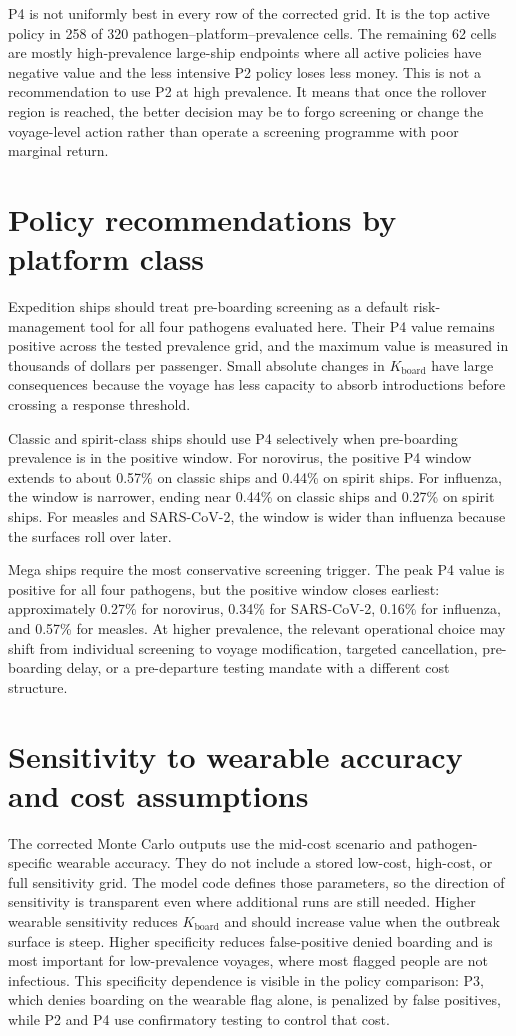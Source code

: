 P4 is not uniformly best in every row of the corrected grid.
It is the top active policy in 258 of 320 pathogen--platform--prevalence cells.
The remaining 62 cells are mostly high-prevalence large-ship endpoints where all active policies have
negative value and the less intensive P2 policy loses less money.
This is not a recommendation to use P2 at high prevalence.
It means that once the rollover region is reached, the better decision may be to forgo screening or
change the voyage-level action rather than operate a screening programme with poor marginal return.

\section{Policy recommendations by platform class}
Expedition ships should treat pre-boarding screening as a default risk-management tool for all four
pathogens evaluated here.
Their P4 value remains positive across the tested prevalence grid, and the maximum value is measured
in thousands of dollars per passenger.
Small absolute changes in $K_{\mathrm{board}}$ have large consequences because the voyage has less
capacity to absorb introductions before crossing a response threshold.

Classic and spirit-class ships should use P4 selectively when pre-boarding prevalence is in the
positive window.
For norovirus, the positive P4 window extends to about 0.57\% on classic ships and 0.44\% on spirit
ships.
For influenza, the window is narrower, ending near 0.44\% on classic ships and 0.27\% on spirit
ships.
For measles and SARS-CoV-2, the window is wider than influenza because the surfaces roll over later.

Mega ships require the most conservative screening trigger.
The peak P4 value is positive for all four pathogens, but the positive window closes earliest:
approximately 0.27\% for norovirus, 0.34\% for SARS-CoV-2, 0.16\% for influenza, and 0.57\% for
measles.
At higher prevalence, the relevant operational choice may shift from individual screening to voyage
modification, targeted cancellation, pre-boarding delay, or a pre-departure testing mandate with a
different cost structure.

\section{Sensitivity to wearable accuracy and cost assumptions}
The corrected Monte Carlo outputs use the mid-cost scenario and pathogen-specific wearable accuracy.
They do not include a stored low-cost, high-cost, or full sensitivity grid.
The model code defines those parameters, so the direction of sensitivity is transparent even where
additional runs are still needed.
Higher wearable sensitivity reduces $K_{\mathrm{board}}$ and should increase value when the outbreak
surface is steep.
Higher specificity reduces false-positive denied boarding and is most important for low-prevalence
voyages, where most flagged people are not infectious.
This specificity dependence is visible in the policy comparison: P3, which denies boarding on the
wearable flag alone, is penalized by false positives, while P2 and P4 use confirmatory testing to
control that cost.

